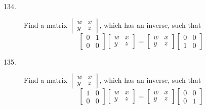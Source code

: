 \documentclass{article}
\begin{document}
\begin{description}

  \item[134.] Find a matrix $\begin{bmatrix} w & x \\ y & z \end{bmatrix}$, which has an inverse, such that
    \begin{equation*}
      \begin{bmatrix} 0 & 1 \\ 0 & 0 \end{bmatrix}  \begin{bmatrix} w & x \\ y & z \end{bmatrix}
      = \begin{bmatrix} w & x \\ y & z \end{bmatrix}  \begin{bmatrix} 0 & 0 \\ 1 & 0 \end{bmatrix}
    \end{equation*}

  \item[135.] Find a matrix $\begin{bmatrix} w & x \\ y & z \end{bmatrix}$, which has an inverse, such that
    \begin{equation*}
      \begin{bmatrix} 1 & 0 \\ 0 & 0 \end{bmatrix}  \begin{bmatrix} w & x \\ y & z \end{bmatrix}
      = \begin{bmatrix} w & x \\ y & z \end{bmatrix}  \begin{bmatrix} 0 & 0 \\ 0 & 1 \end{bmatrix}
    \end{equation*}


\end{description}
\end{document}
